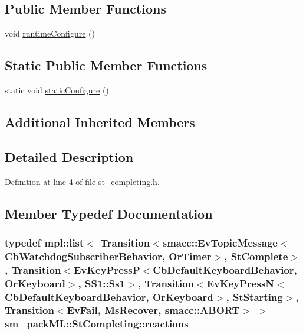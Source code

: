 \subsection*{Public Member Functions}
\begin{DoxyCompactItemize}
\item 
void \hyperlink{structsm__packML_1_1StCompleting_a3d02e214c28fb1b9081aee053c608a8b}{runtime\+Configure} ()
\end{DoxyCompactItemize}
\subsection*{Static Public Member Functions}
\begin{DoxyCompactItemize}
\item 
static void \hyperlink{structsm__packML_1_1StCompleting_a67bbe8665dd9e951fb6c3c537a984d9b}{static\+Configure} ()
\end{DoxyCompactItemize}
\subsection*{Additional Inherited Members}


\subsection{Detailed Description}


Definition at line 4 of file st\+\_\+completing.\+h.



\subsection{Member Typedef Documentation}
\subsubsection[{\texorpdfstring{reactions}{reactions}}]{\setlength{\rightskip}{0pt plus 5cm}typedef mpl\+::list$<$ Transition$<${\bf smacc\+::\+Ev\+Topic\+Message}$<${\bf Cb\+Watchdog\+Subscriber\+Behavior}, {\bf Or\+Timer}$>$, {\bf St\+Complete}$>$, Transition$<$Ev\+Key\+PressP$<$Cb\+Default\+Keyboard\+Behavior, {\bf Or\+Keyboard}$>$, {\bf S\+S1\+::\+Ss1}$>$, Transition$<$Ev\+Key\+PressN$<$Cb\+Default\+Keyboard\+Behavior, {\bf Or\+Keyboard}$>$, {\bf St\+Starting}$>$, Transition$<${\bf Ev\+Fail}, {\bf Ms\+Recover}, {\bf smacc\+::\+A\+B\+O\+RT}$>$ $>$ {\bf sm\+\_\+pack\+M\+L\+::\+St\+Completing\+::reactions}}\hypertarget{structsm__packML_1_1StCompleting_a01871cc8ae8e2e406c056568088bd11f}{}\label{structsm__packML_1_1StCompleting_a01871cc8ae8e2e406c056568088bd11f}


